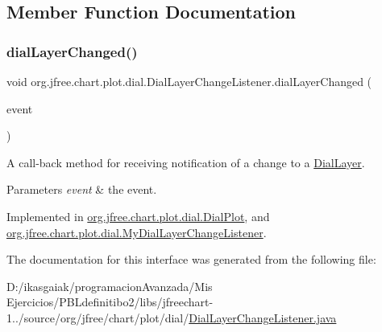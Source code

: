 \subsection{Member Function Documentation}
\mbox{\label{interfaceorg_1_1jfree_1_1chart_1_1plot_1_1dial_1_1_dial_layer_change_listener_ad97d40ca8aa072d975cd285da2b07c75}} 
\subsubsection{\texorpdfstring{dial\+Layer\+Changed()}{dialLayerChanged()}}
{\footnotesize\ttfamily void org.\+jfree.\+chart.\+plot.\+dial.\+Dial\+Layer\+Change\+Listener.\+dial\+Layer\+Changed (\begin{DoxyParamCaption}\item[{\mbox{\hyperlink{classorg_1_1jfree_1_1chart_1_1plot_1_1dial_1_1_dial_layer_change_event}{Dial\+Layer\+Change\+Event}}}]{event }\end{DoxyParamCaption})}

A call-\/back method for receiving notification of a change to a \mbox{\hyperlink{interfaceorg_1_1jfree_1_1chart_1_1plot_1_1dial_1_1_dial_layer}{Dial\+Layer}}.


\begin{DoxyParams}{Parameters}
{\em event} & the event. \\
\hline
\end{DoxyParams}


Implemented in \mbox{\hyperlink{classorg_1_1jfree_1_1chart_1_1plot_1_1dial_1_1_dial_plot_aaa3708c0186d65525c74e859c5232e39}{org.\+jfree.\+chart.\+plot.\+dial.\+Dial\+Plot}}, and \mbox{\hyperlink{classorg_1_1jfree_1_1chart_1_1plot_1_1dial_1_1_my_dial_layer_change_listener_aea7aacb233552b8f721c5de636a98cab}{org.\+jfree.\+chart.\+plot.\+dial.\+My\+Dial\+Layer\+Change\+Listener}}.



The documentation for this interface was generated from the following file\+:\begin{DoxyCompactItemize}
\item 
D\+:/ikasgaiak/programacion\+Avanzada/\+Mis Ejercicios/\+P\+B\+Ldefinitibo2/libs/jfreechart-\/1../source/org/jfree/chart/plot/dial/\mbox{\hyperlink{_dial_layer_change_listener_8java}{Dial\+Layer\+Change\+Listener.\+java}}\end{DoxyCompactItemize}
